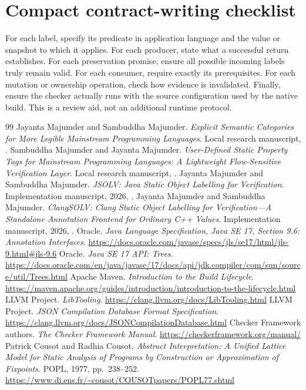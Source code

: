 \documentclass[11pt]{article}
\begin{document}
\section{Compact contract-writing checklist}
For each label, specify its predicate in application language and the value
or snapshot to which it applies. For each producer, state what a successful
return establishes. For each preservation promise, ensure all possible incoming
labels truly remain valid. For each consumer, require exactly its prerequisites.
For each mutation or ownership operation, check how evidence is invalidated.
Finally, ensure the checker actually runs with the source configuration used
by the native build. This is a review aid, not an additional runtime protocol.

\begin{thebibliography}{99}
 Jayanta Majumder and Sambuddha Majumder.
\emph{Explicit Semantic Categories for More Legible Mainstream Programming
Languages}. Local research manuscript, .
 Sambuddha Majumder and Jayanta Majumder.
\emph{User-Defined Static Property Tags for Mainstream Programming Languages:
A Lightweight Flow-Sensitive Verification Layer}. Local research manuscript,
.
 Jayanta Majumder and Sambuddha Majumder.
\emph{JSOLV: Java Static Object Labelling for Verification}. Implementation
manuscript, 2026, .
 Jayanta Majumder and Sambuddha Majumder.
\emph{ClangSOLV: Clang Static Object Labelling for Verification---A Standalone
Annotation Frontend for Ordinary C++ Values}. Implementation manuscript, 2026, .
 Oracle. \emph{Java Language Specification, Java SE 17,
Section 9.6: Annotation Interfaces}.
\url{https://docs.oracle.com/javase/specs/jls/se17/html/jls-9.html#jls-9.6}
 Oracle. \emph{Java SE 17 API: Trees}.
\url{https://docs.oracle.com/en/java/javase/17/docs/api/jdk.compiler/com/sun/source/util/Trees.html}
 Apache Maven. \emph{Introduction to the Build Lifecycle}.
\url{https://maven.apache.org/guides/introduction/introduction-to-the-lifecycle.html}
 LLVM Project. \emph{LibTooling}.
\url{https://clang.llvm.org/docs/LibTooling.html}
 LLVM Project. \emph{JSON Compilation Database Format Specification}.
\url{https://clang.llvm.org/docs/JSONCompilationDatabase.html}
 Checker Framework authors.
\emph{The Checker Framework Manual}.
\url{https://checkerframework.org/manual/}
 Patrick Cousot and Radhia Cousot.
\emph{Abstract Interpretation: A Unified Lattice Model for Static Analysis
of Programs by Construction or Approximation of Fixpoints}. POPL, 1977,
pp.~238--252.
\url{https://www.di.ens.fr/~cousot/COUSOTpapers/POPL77.shtml}
\end{thebibliography}
\end{document}
